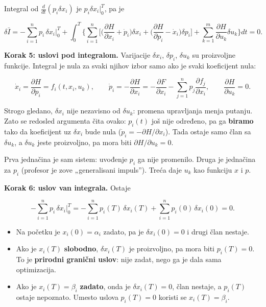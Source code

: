 \documentclass[11pt,a4paper,parskip=half,headsepline,numbers=noenddot]{scrartcl}
\begin{document}
Integral od \(\frac{d}{dt}(p_i\delta x_i)\) je \(p_i\delta x_i\big|_0^T\), pa je

\[\delta \bar I = -\sum_{i=1}^n p_i\,\delta x_i\Big|_0^T + \int_0^T \Big\{ \sum_{i=1}^n \Big[ \Big(\frac{\partial H}{\partial x_i} + \dot p_i\Big)\delta x_i + \Big(\frac{\partial H}{\partial p_i} - \dot x_i\Big)\delta p_i \Big] + \sum_{k=1}^m \frac{\partial H}{\partial u_k}\delta u_k \Big\} dt = 0 .\]

\textbf{Korak 5: uslovi pod integralom.} Varijacije \(\delta x_i\), \(\delta p_i\), \(\delta u_k\) su proizvoljne funkcije. Integral je nula za svaki njihov izbor samo ako je svaki koeficijent nula:

\[\dot x_i = \frac{\partial H}{\partial p_i} = f_i(t, x_i, u_k), \qquad \dot p_i = -\frac{\partial H}{\partial x_i} = -\frac{\partial F}{\partial x_i} - \sum_{j=1}^n p_j\frac{\partial f_j}{\partial x_i}, \qquad \frac{\partial H}{\partial u_k} = 0 .\]

\begin{zasto}
Strogo gledano, \(\delta x_i\) nije nezavisno od \(\delta u_k\): promena upravljanja menja putanju. Zato se redosled argumenta čita ovako: \(p_i(t)\) još nije određeno, pa ga \textbf{biramo} tako da koeficijent uz \(\delta x_i\) bude nula (\(\dot p_i = -\partial H/\partial x_i\)). Tada ostaje samo član sa \(\delta u_k\), a \(\delta u_k\) jeste proizvoljno, pa mora biti \(\partial H/\partial u_k = 0\).
\end{zasto}

Prva jednačina je sam sistem: uvođenje \(p_i\) ga nije promenilo. Druga je jednačina za \(p_i\) (profesor je zove „generalisani impuls''). Treća daje \(u_k\) kao funkciju \(x\) i \(p\).

\textbf{Korak 6: uslov van integrala.} Ostaje

\[-\sum_{i=1}^n p_i\,\delta x_i\Big|_0^T = -\sum_{i=1}^n p_i(T)\,\delta x_i(T) + \sum_{i=1}^n p_i(0)\,\delta x_i(0) = 0 .\]

\begin{itemize}
\item Na početku je \(x_i(0) = \alpha_i\) zadato, pa je \(\delta x_i(0) = 0\) i drugi član nestaje.
\item Ako je \(x_i(T)\) \textbf{slobodno}, \(\delta x_i(T)\) je proizvoljno, pa mora biti \(p_i(T) = 0\). To je \textbf{prirodni granični uslov}: nije zadat, nego ga je dala sama optimizacija.
\item Ako je \(x_i(T) = \beta_i\) \textbf{zadato}, onda je \(\delta x_i(T) = 0\), član nestaje, a \(p_i(T)\) ostaje nepoznato. Umesto uslova \(p_i(T) = 0\) koristi se \(x_i(T) = \beta_i\).
\end{itemize}
\end{document}
